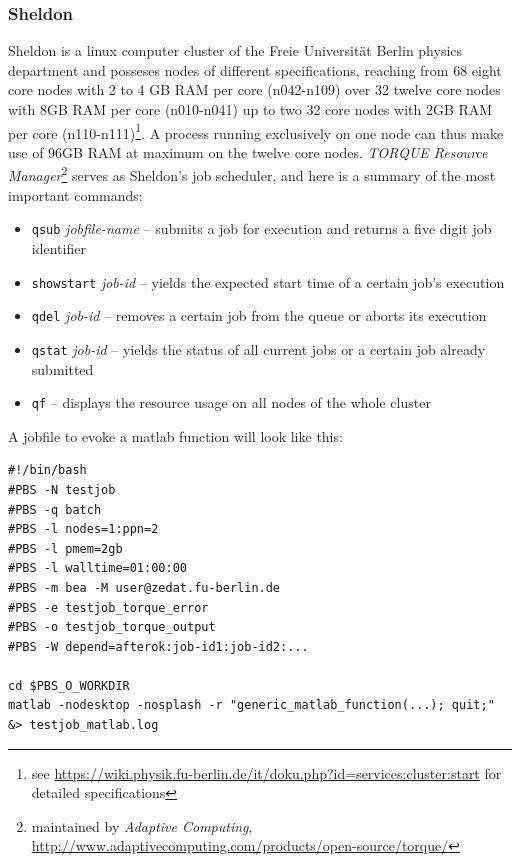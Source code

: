 \documentclass[11.5pt,a4paper]{article}
\begin{document}
\subsubsection{Sheldon}
\label{sec-sheldon}
Sheldon is a linux computer cluster of the Freie Universit\"at Berlin physics department and posseses nodes of different specifications, reaching from 68 eight core nodes with 2 to 4 GB RAM per core (n042-n109) over 32 twelve core nodes with 8GB RAM per core (n010-n041) up to two 32 core nodes with 2GB RAM per core (n110-n111)\footnote{see \url{https://wiki.physik.fu-berlin.de/it/doku.php?id=services:cluster:start} for detailed specifications}. A process running exclusively on one node can thus make use of 96GB RAM at maximum on the twelve core nodes. \emph{TORQUE Resource Manager}\footnote{maintained by \emph{Adaptive Computing}, \url{http://www.adaptivecomputing.com/products/open-source/torque/}} serves as Sheldon's job scheduler, and here is a summary of the most important commands:
\begin{itemize}
 \item \verb$qsub$ \emph{jobfile-name} -- submits a job for execution and returns a five digit job identifier
  \item \verb$showstart$ \emph{job-id} -- yields the expected start time of a certain job's execution
  \item \verb$qdel$ \emph{job-id} -- removes a certain job from the queue or aborts its execution
  \item \verb$qstat$ {\emph{job-id}} -- yields the status of all current jobs {or a certain job already submitted}
  \item \verb$qf$ -- displays the resource usage on all nodes of the whole cluster
\end{itemize}
A jobfile to evoke a matlab function will look like this:
\begin{lstlisting}
#!/bin/bash
#PBS -N testjob
#PBS -q batch
#PBS -l nodes=1:ppn=2
#PBS -l pmem=2gb
#PBS -l walltime=01:00:00
#PBS -m bea -M user@zedat.fu-berlin.de
#PBS -e testjob_torque_error
#PBS -o testjob_torque_output
#PBS -W depend=afterok:job-id1:job-id2:...

cd $PBS_O_WORKDIR
matlab -nodesktop -nosplash -r "generic_matlab_function(...); quit;" &> testjob_matlab.log
\end{lstlisting}
\end{document}
